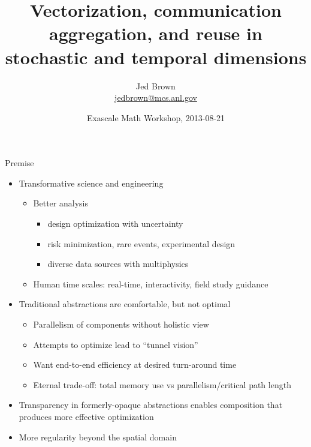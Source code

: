 \documentclass{beamer}
\title{Vectorization, communication aggregation, and reuse in stochastic and temporal dimensions}
\author{Jed Brown \\ \url{jedbrown@mcs.anl.gov}}
\institute
{
  Mathematics and Computer Science Division \\ Argonne National Laboratory
}
\date{Exascale Math Workshop, 2013-08-21}
\begin{document}
\lstset{language=C}
\normalem

\begin{frame}
  \titlepage
\end{frame}


\begin{frame}{Premise}
  \begin{itemize}
  \item Transformative science and engineering
    \begin{itemize}
    \item Better analysis
      \begin{itemize}
      \item design optimization with uncertainty
      \item risk minimization, rare events, experimental design
      \item diverse data sources with multiphysics
      \end{itemize}
    \item Human time scales: real-time, interactivity, field study guidance
    \end{itemize}
  \item Traditional abstractions are comfortable, but not optimal
    \begin{itemize}
    \item Parallelism of components without holistic view
    \item Attempts to optimize lead to ``tunnel vision''
    \item Want end-to-end efficiency at desired turn-around time
    \item Eternal trade-off: total memory use vs parallelism/critical path length
    \end{itemize}
  \item Transparency in formerly-opaque abstractions enables composition that produces more effective optimization
  \item More regularity beyond the spatial domain
  \end{itemize}
\end{frame}
\end{document}

